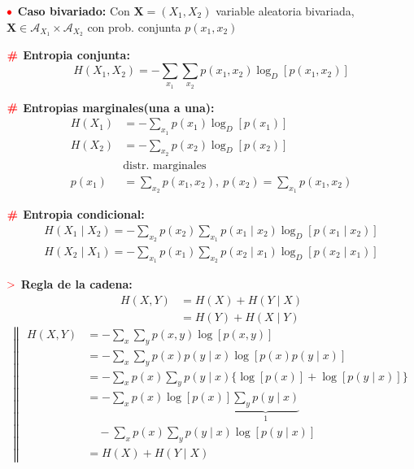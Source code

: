 \documentclass[%
 reprint,
 amsmath,amssymb,
 aps,
]{revtex4-1}
\begin{document}
\textbf{$\color{red}{\bullet}$ Caso bivariado:}
Con $\mathbf{X}=\left(X_{1}, X_{2}\right)$ variable aleatoria bivariada, $\mathbf{X} \in \mathcal{A}_{X_{1}}\times\mathcal{A}_{X_{2}}$ con prob. conjunta $p\left(x_{1}, x_{2}\right)$

\textbf{$\color{red}{\textbf{\#}}$ Entropia conjunta: }
$$
H\left(X_{1}, X_{2}\right)=-\sum_{x_{1}} \sum_{x_{2}} p\left(x_{1}, x_{2}\right) \log _{D}\left[p\left(x_{1}, x_{2}\right)\right]
$$

\textbf{$\color{red}{\textbf{\#}}$ Entropias marginales(una a una): }
$$
\begin{aligned}
H\left(X_{1}\right)&=-\sum_{x_{1}} p\left(x_{1}\right) \log _{D}\left[p\left(x_{1}\right)\right] \\
H\left(X_{2}\right)&=-\sum_{x_{2}} p\left(x_{2}\right) \log _{D}\left[p\left(x_{2}\right)\right] \\
&\text{distr. marginales } \\
p\left(x_{1}\right)&=\sum_{x_{2}} p\left(x_{1}, x_{2}\right), \
p\left(x_{2}\right)=\sum_{x_{1}} p\left(x_{1}, x_{2}\right)
\end{aligned}
$$

\textbf{$\color{red}{\textbf{\#}}$ Entropia condicional:}
$$
\begin{aligned}
H\left(X_{1} \mid X_{2}\right)=-\sum_{x_{2}} p\left(x_{2}\right) \sum_{x_{1}} p\left(x_{1} \mid x_{2}\right) \log _{D}\left[p\left(x_{1} \mid x_{2}\right)\right] \\
H\left(X_{2} \mid X_{1}\right)=-\sum_{x_{1}} p\left(x_{1}\right) \sum_{x_{2}} p\left(x_{2} \mid x_{1}\right) \log _{D}\left[p\left(x_{2} \mid x_{1}\right)\right]
\end{aligned}
$$

\textbf{$\textcolor{red}{\mathbf{>}}$ Regla de la cadena: }
$$
\begin{aligned}
  H(X, Y) &= H(X)+H(Y \mid X) \\ 
        &= H(Y)+H(X \mid Y)
\end{aligned}
$$
$$
\left\|
\begin{aligned}
H(X, Y) &=-\sum_{x} \sum_{y} p(x, y) \log [p(x, y)] \\
&=-\sum_{x} \sum_{y} p(x) p(y \mid x) \log [p(x) p(y \mid x)] \\
&=-\sum_{x} p(x) \sum_{y} p(y \mid x)\{\log [p(x)]+\log [p(y \mid x)]\} \\
&=-\sum_{x} p(x) \log [p(x)] \underbrace{\sum_{y} p(y \mid x)}_{1}  \\
& \quad  - \sum_{x} p(x) \sum_{y} p(y \mid x) \log [p(y \mid x)] \\
&=H(X)+H(Y \mid X)
\end{aligned}
\right.
$$
\end{document}
